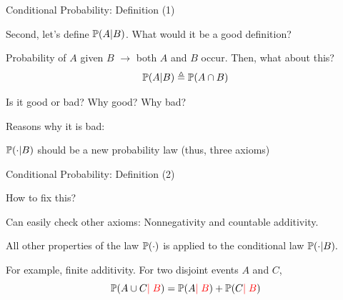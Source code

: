 \documentclass[fleqn,aspectratio=169]{beamer}
\begin{document}
\begin{frame}{Conditional Probability: Definition (1)}

\plitemsep 0.1in
\bci 

\item<1-> Second, let's define $\mathbb{P}( A | B )$. What would it be a good definition?

\item<2-> Probability of $A$ given $B$ $\rightarrow$ both $A$ and $B$ occur. Then, what about this?
$$
\mathbb{P}( A | B ) \triangleq \mathbb{P}( A \cap B )
$$

\item<3-> Is it good or bad? Why good? Why bad?

\item<4-> Reasons why it is bad: 

\bci
\item $\mathbb{P}( \cdot | B )$ should be a new probability law (thus, three axioms)
\eci


\medskip



\eci 

\end{frame}

\begin{frame}{Conditional Probability: Definition (2)}

\plitemsep 0.1in
\bci 

\item<1-> How to fix this?  

\item<4-> Can easily check other axioms: Nonnegativity and countable additivity.  

\item<5-> All other properties of the law $\mathbb{P}( \cdot )$ is applied to the conditional law $\mathbb{P}( \cdot | B ).$ 

\item<6-> For example, finite additivity. For two disjoint events $A$ and $C$, 
$$
\mathbb{P}( A \cup C {\color{red} \mid B} ) = \mathbb{P}( A {\color{red} \mid B} ) + \mathbb{P}( C {\color{red} \mid B} )
$$
\eci 

\end{frame}
\end{document}
